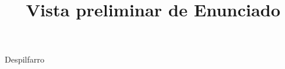 \documentclass[a4paper,12pt]{article}\usepackage[utf8]{inputenc}\usepackage[spanish]{babel}\usepackage{times}
\title{Vista preliminar de Enunciado}
\begin{document}
\twocolumn 

\maketitle

Despilfarro
\end{document}
